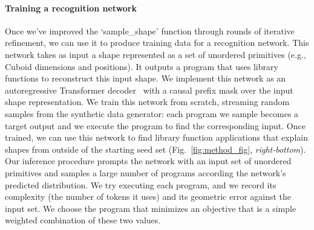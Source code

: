 \paragraph{Training a recognition network}

Once we've improved the `sample\_shape' function through rounds of iterative refinement, we can use it to produce training data for a recognition network.
This network takes as input a shape represented as a set of unordered primitives (e.g., Cuboid dimensions and positions).
It outputs a program that uses library functions to reconstruct this input shape.
We implement this network as an autoregressive Transformer decoder~\cite{att_is_all} with a causal prefix mask over the input shape representation.
We train this network from scratch, streaming random samples from the synthetic data generator: each program we sample becomes a target output and we execute the program to find the corresponding input.
Once trained, we can use this network to find library function applications that explain shapes from outside of the starting seed set (Fig.~\ref{fig:method_fig}, \textit{right-bottom}).  
Our inference procedure prompts the network with an input set of unordered primitives and samples a large number of programs according the network's predicted distribution.
We try executing each program, and we record its complexity (the number of tokens it uses) and its geometric error against the input set. 
We choose the program that minimizes an objective that is a simple weighted combination of these two values.





























